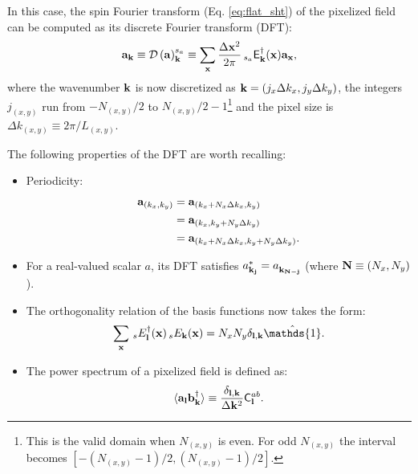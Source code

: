 \documentclass[usenatbib]{mnrasb}
\newcommand{\mI}{{\mathds{1}}}
\begin{document}
      In this case, the spin Fourier transform (Eq. \ref{eq:flat_sht}) of the pixelized field can be computed as its discrete Fourier transform (DFT):
      \begin{equation}\label{eq:dft}
        {\bf a}_{\bf k}\equiv {\cal D}\left({\bf a}\right)^{s_a}_{\bf k}\equiv\sum_{\bf x}\frac{\Delta{\bf x}^2}{2\pi}\,_{s_a}{\sf E}^\dag_{\bf k}({\bf x}){\bf a}_{\bf x},
      \end{equation}
      where the wavenumber ${\bf k}$ is now discretized as ${\bf k}=(j_x\Delta k_x,j_y\Delta k_y)$, the integers $j_{(x,y)}$ run from $-N_{(x,y)}/2$ to $N_{(x,y)}/2-1$\footnote{This is the valid domain when $N_{(x,y)}$ is even. For odd $N_{(x,y)}$ the interval becomes $[-(N_{(x,y)}-1)/2,(N_{(x,y)}-1)/2]$.} and the pixel size is $\Delta k_{(x,y)}\equiv2\pi/L_{(x,y)}$.
    
      The following properties of the DFT are worth recalling:
      \begin{itemize}
       \item Periodicity:
             \begin{align}\nonumber
               {\bf a}_{(k_x,k_y)}&={\bf a}_{(k_x+N_x\Delta k_x,k_y)}\\\nonumber&={\bf a}_{(k_x,k_y+N_y\Delta k_y)}\\&={\bf a}_{(k_x+N_x\Delta k_x,k_y+N_y\Delta k_y)}.
             \end{align}
       \item For a real-valued scalar $a$, its DFT satisfies $a^*_{{\bf k}_{\bf j}}=a^{}_{{\bf k}_{{\bf N}-{\bf j}}}$ (where ${\bf N}\equiv(N_x,N_y)$).
       \item The orthogonality relation of the basis functions now takes the form:
             \begin{equation}
               \sum_{\bf x}\,_sE^\dag_{\bf l}({\bf x})\,_sE_{\bf k}({\bf x})=N_xN_y\delta_{{\bf l},{\bf k}}\hat\mI.
             \end{equation}
       \item The power spectrum of a pixelized field is defined as:
             \begin{equation}
               \langle{\bf a}_{\bf l}{\bf b}^\dag_{\bf k}\rangle\equiv\frac{\delta_{{\bf l},{\bf k}}}{\Delta{\bf k}^2}{\sf C}^{ab}_{\bf l}.
             \end{equation}
      \end{itemize}
\end{document}
